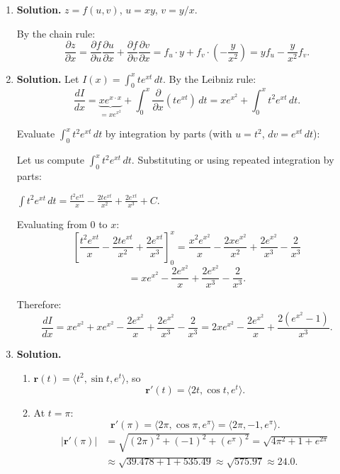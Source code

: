 \begin{enumerate}
\item \textbf{Solution.}
$z = f(u,v)$, $u = xy$, $v = y/x$.

By the chain rule:
\[
\frac{\partial z}{\partial x} = \frac{\partial f}{\partial u}\frac{\partial u}{\partial x} + \frac{\partial f}{\partial v}\frac{\partial v}{\partial x} = f_u \cdot y + f_v \cdot \left(-\frac{y}{x^2}\right) = \boxed{yf_u - \frac{y}{x^2}f_v}.
\]

\item \textbf{Solution.}
Let $I(x) = \displaystyle\int_0^x te^{xt}\,dt$. By the Leibniz rule:
\[
\frac{dI}{dx} = \underbrace{x e^{x \cdot x}}_{= x e^{x^2}} + \int_0^x \frac{\partial}{\partial x}(te^{xt})\,dt = xe^{x^2} + \int_0^x t^2 e^{xt}\,dt.
\]

Evaluate $\displaystyle\int_0^x t^2 e^{xt}\,dt$ by integration by parts (with $u = t^2$, $dv = e^{xt}\,dt$):

Let us compute $\int_0^x t^2 e^{xt}\,dt$. Substituting or using repeated integration by parts:

$\displaystyle\int t^2 e^{xt}\,dt = \frac{t^2 e^{xt}}{x} - \frac{2t e^{xt}}{x^2} + \frac{2e^{xt}}{x^3} + C$.

Evaluating from 0 to $x$:
\[
\left[\frac{t^2 e^{xt}}{x} - \frac{2te^{xt}}{x^2} + \frac{2e^{xt}}{x^3}\right]_0^x = \frac{x^2 e^{x^2}}{x} - \frac{2xe^{x^2}}{x^2} + \frac{2e^{x^2}}{x^3} - \frac{2}{x^3}
\]
\[
= xe^{x^2} - \frac{2e^{x^2}}{x} + \frac{2e^{x^2}}{x^3} - \frac{2}{x^3}.
\]

Therefore:
\[
\frac{dI}{dx} = xe^{x^2} + xe^{x^2} - \frac{2e^{x^2}}{x} + \frac{2e^{x^2}}{x^3} - \frac{2}{x^3} = \boxed{2xe^{x^2} - \frac{2e^{x^2}}{x} + \frac{2(e^{x^2}-1)}{x^3}}.
\]

\item \textbf{Solution.}

\begin{enumerate}
    \item $\mathbf{r}(t) = \langle t^2, \sin t, e^t\rangle$, so
    \[
    \mathbf{r}'(t) = \langle 2t, \cos t, e^t\rangle.
    \]

    \item At $t = \pi$:
    \[
    \mathbf{r}'(\pi) = \langle 2\pi, \cos\pi, e^{\pi}\rangle = \langle 2\pi, -1, e^{\pi}\rangle.
    \]
    \begin{align*}
    |\mathbf{r}'(\pi)| &= \sqrt{(2\pi)^2 + (-1)^2 + (e^{\pi})^2}
    = \sqrt{4\pi^2 + 1 + e^{2\pi}} \\
    &\approx \sqrt{39.478 + 1 + 535.49}
    \approx \sqrt{575.97} \approx \boxed{24.0}.
    \end{align*}
\end{enumerate}


\end{enumerate}

